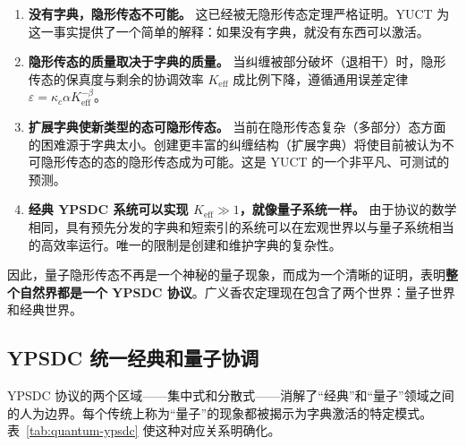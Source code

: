 \documentclass[12pt,a4paper]{article}
\theoremstyle{remark}
\begin{document}
	\begin{enumerate}
		\item \textbf{没有字典，隐形传态不可能。} 这已经被无隐形传态定理严格证明。YUCT 为这一事实提供了一个简单的解释：如果没有字典，就没有东西可以激活。
		\item \textbf{隐形传态的质量取决于字典的质量。} 当纠缠被部分破坏（退相干）时，隐形传态的保真度与剩余的协调效率 \( K_{\mathrm{eff}} \) 成比例下降，遵循通用误差定律 \( \varepsilon = \kappa_c \alpha K_{\mathrm{eff}}^{-\beta} \)。
		\item \textbf{扩展字典使新类型的态可隐形传态。} 当前在隐形传态复杂（多部分）态方面的困难源于字典太小。创建更丰富的纠缠结构（扩展字典）将使目前被认为不可隐形传态的态的隐形传态成为可能。这是 YUCT 的一个非平凡、可测试的预测。
		\item \textbf{经典 YPSDC 系统可以实现 \( K_{\mathrm{eff}} \gg 1 \)，就像量子系统一样。} 由于协议的数学相同，具有预先分发的字典和短索引的系统可以在宏观世界以与量子系统相当的高效率运行。唯一的限制是创建和维护字典的复杂性。
	\end{enumerate}
	
	因此，量子隐形传态不再是一个神秘的量子现象，而成为一个清晰的证明，表明\textbf{整个自然界都是一个 YPSDC 协议}。广义香农定理现在包含了两个世界：量子世界和经典世界。
	
	\subsection{YPSDC 统一经典和量子协调}
	\label{subsec:unified-table}
	
	YPSDC 协议的两个区域——集中式和分散式——消解了“经典”和“量子”领域之间的人为边界。每个传统上称为“量子”的现象都被揭示为字典激活的特定模式。表~\ref{tab:quantum-ypsdc} 使这种对应关系明确化。
	
\end{document}
